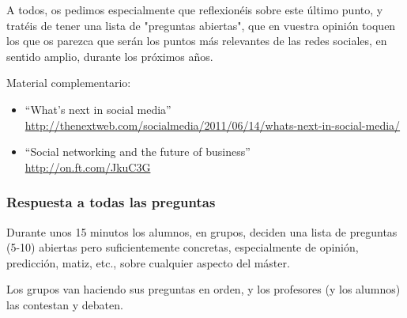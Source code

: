 \documentclass[a4paper,12pt]{article}
\begin{document}
A todos, os pedimos especialmente que reflexionéis sobre este último punto, y tratéis de tener una lista de "preguntas abiertas", que en vuestra opinión toquen los que os parezca que serán los puntos más relevantes de las redes sociales, en sentido amplio, durante los próximos años.

Material complementario:

\begin{itemize}
\item ``What's next in social media'' \\
  \url{http://thenextweb.com/socialmedia/2011/06/14/whats-next-in-social-media/}
\item ``Social networking and the future of business'' \\
  \url{http://on.ft.com/JkuC3G}
\end{itemize}

\subsubsection{Respuesta a todas las preguntas}
\label{sub:respuesta-todo}

Durante unos 15 minutos los alumnos, en grupos, deciden una lista de preguntas (5-10) abiertas pero suficientemente concretas, especialmente de opinión, predicción, matiz, etc., sobre cualquier aspecto del máster.

Los grupos van haciendo sus preguntas en orden, y los profesores (y los alumnos) las contestan y debaten.
\end{document}
